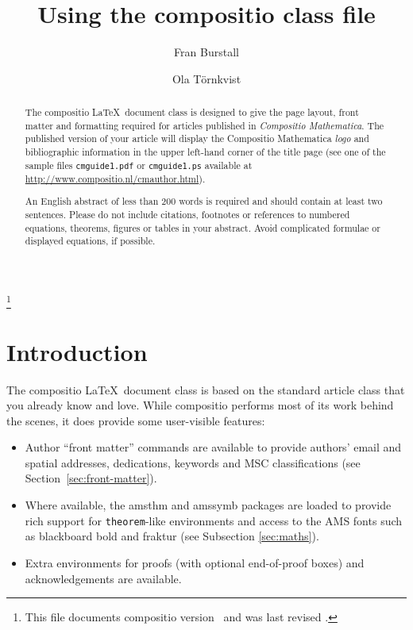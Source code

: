 \documentclass[noams]{compositio}
\newcommand*{\code}[1]{{\mdseries\texttt{#1}}}
\newcommand*{\pkg}[1]{{\mdseries\textsf{#1}}}
\begin{document}
\title{Using the \pkg{compositio} class file}
%
\author{Fran Burstall}
\email{}
\address{}
%
\author{Ola T\"{o}rnkvist}
\address{}
%
\dedication{A dedication can be included here.}
\thanks{This file documents \pkg{compositio} version \Fileversion\ and
was last revised \Filedate.}

\begin{abstract}
The \pkg{compositio} \LaTeX\ document class is designed to give
the page layout, front matter and formatting required for articles
published in \emph{Compositio Mathematica}. The published version
of your article will display the Compositio Mathematica
\textit{logo} and bibliographic information in the upper left-hand
corner of the title page (see one of the sample files
\code{cmguide1.pdf} or \code{cmguide1.ps} available at
\url{http://www.compositio.nl/cmauthor.html}).

An English abstract of less than 200 words is required and should
contain at least two sentences. Please do not include citations,
footnotes or references to numbered equations, theorems, figures
or tables in your abstract. Avoid complicated formulae or
displayed equations, if possible.
\end{abstract}

\maketitle

\vspace*{6pt}\tableofcontents  %

\section{Introduction}
\label{sec:introduction}

The \pkg{compositio} \LaTeX\ document class is based on the
standard \pkg{article} class that you already know and love. While
\pkg{compositio} performs most of its work behind the scenes, it
does provide some user-visible features:
\begin{itemize}
\item Author ``front matter'' commands are available to provide
authors' email and spatial addresses, dedications, keywords and MSC
classifications (see Section~\ref{sec:front-matter}).
\item Where available, the \pkg{amsthm} and \pkg{amssymb} packages
are loaded to provide rich support for \texttt{theorem}-like
environments and access to the AMS fonts such as blackboard bold
and fraktur (see Subsection \ref{sec:maths}).
\item Extra environments for proofs (with optional end-of-proof
boxes) and acknowledgements are available.
\end{itemize}
\end{document}

